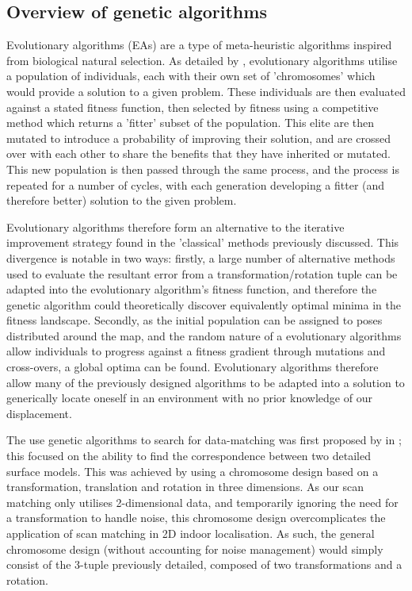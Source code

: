 \documentclass[authoryearcitations]{UoYCSproject}
\begin{document}
\subsection{Overview of genetic algorithms}
Evolutionary algorithms (EAs) are a type of meta-heuristic algorithms inspired from biological natural selection. As detailed by \citet{Whitley1994-tx}, evolutionary algorithms utilise a population of individuals, each with their own set of 'chromosomes' which would provide a solution to a given problem. These individuals are then evaluated against a stated fitness function, then selected by fitness using a competitive method which returns a 'fitter' subset of the population. This elite are then mutated to introduce a probability of improving their solution, and are crossed over with each other to share the benefits that they have inherited or mutated. This new population is then passed through the same process, and the process is repeated for a number of cycles, with each generation developing a fitter (and therefore better) solution to the given problem. 

Evolutionary algorithms therefore form an alternative to the iterative improvement strategy found in the 'classical' methods previously discussed. This divergence is notable in two ways: firstly, a large number of alternative methods used to evaluate the resultant error from a transformation/rotation tuple can be adapted into the evolutionary algorithm's fitness function, and therefore the genetic algorithm could theoretically discover equivalently optimal minima in the fitness landscape. Secondly, as the initial population can be assigned to poses distributed around the map, and the random nature of a evolutionary algorithms allow individuals to progress against a fitness gradient through mutations and cross-overs, a global optima can be found. Evolutionary algorithms therefore allow many of the previously designed algorithms to be adapted into a solution to generically locate oneself in an environment with no prior knowledge of our displacement.

The use genetic algorithms to search for data-matching was first proposed by \citet{Brunnstrom1996-vo} in \citeyear{Brunnstrom1996-vo}; this focused on the ability to find the correspondence between two detailed surface models. This was achieved by using a chromosome design based on a transformation, translation and rotation in three dimensions. As our scan matching only utilises 2-dimensional data, and temporarily ignoring the need for a transformation to handle noise, this chromosome design overcomplicates the application of scan matching in 2D indoor localisation. As such, the general chromosome design (without accounting for noise management) would simply consist of the 3-tuple previously detailed, composed of two transformations and a rotation.
\end{document}
